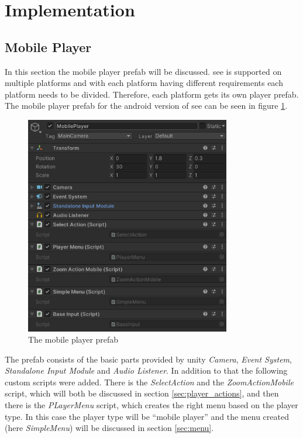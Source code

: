 \section{Implementation}
\label{section:implementation}
\subsection{Mobile Player}
In this section the mobile player \gls{prefab} will be discussed. 
\gls{see} is supported on multiple platforms and with each platform having different requirements each platform needs to be divided.
Therefore, each platform gets its own player \gls{prefab}.
The mobile player prefab for the \gls{android} version of \gls{see} can be seen in figure \ref{fig:prefab}.

\begin{figure}[htb]
    \centering
    \includegraphics[width=0.8\textwidth]{Implementation/img/mobile_player.png}
    \caption{The mobile player \gls{prefab}}\label{fig:prefab}
\end{figure}

The \gls{prefab} consists of the basic parts provided by \gls{unity} \textit{Camera}, \textit{Event System}, \textit{Standalone Input Module} and \textit{Audio Listener}.
In addition to that the following custom scripts were added.
There is the \textit{SelectAction} and the \textit{ZoomActionMobile} script, which will both be discussed in section \ref{sec:player_actions}, and then there is the \textit{PLayerMenu} script, which creates the right menu based on the player type.
In this case the player type will be \enquote{mobile player} and the menu created (here \textit{SimpleMenu}) will be discussed in section \ref{sec:menu}.

